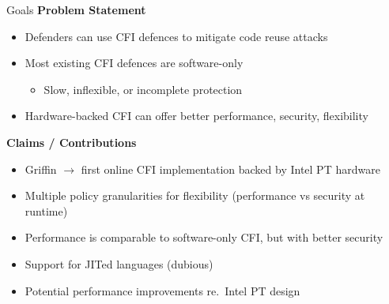 \documentclass[12pt, dvipsnames, aspectratio=169]{beamer}
\begin{document}
\begin{frame}[c]{Goals}{}
  {\bf Problem Statement}
  \begin{itemize}
    \item Defenders can use CFI defences to mitigate code reuse attacks
    \item Most existing CFI defences are software-only
    \begin{itemize}
      \item Slow, inflexible, or incomplete protection
    \end{itemize}
    \item Hardware-backed CFI can offer better performance, security, flexibility
  \end{itemize}

  \vfill
  {\bf Claims / Contributions}
  \begin{itemize}
    \item Griffin $\rightarrow$ first online CFI implementation backed by Intel PT hardware
    \item Multiple policy granularities for flexibility (performance vs security at runtime)
    \item Performance is comparable to software-only CFI, but with better security
    \item Support for JITed languages (dubious)
    \item Potential performance improvements re.~Intel PT design
  \end{itemize}
\end{frame}
\end{document}
